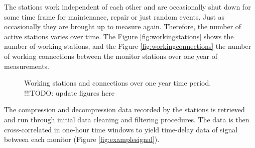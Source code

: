 \documentclass[12pt,a4paper,english]{article}
\newcommand\todo[1]{{\color{red}!!!TODO: #1}}
\begin{document}
The stations work independent of each other and are occasionally shut down for some time frame for maintenance, repair or just random events. Just as occasionally they are brought up to measure again. Therefore, the number of active stations varies over time. The Figure \ref{fig:workingstations} shows the number of working stations, and the Figure \ref{fig:workingconnections} the number of working connections between the monitor stations over one year of measurements. 

\begin{figure}[ht] 
  \centering 
{}
\caption{Working stations and connections over one year time period. \todo{update figures here}}
\label{fig:workingmonitors}
\end{figure}

The compression and decompression data recorded by the stations is retrieved and run through initial data cleaning and filtering procedures. The data is then cross-correlated in one-hour time windows to yield time-delay data of signal between each monitor (Figure \ref{fig:examplesignal}). 

\end{document}

